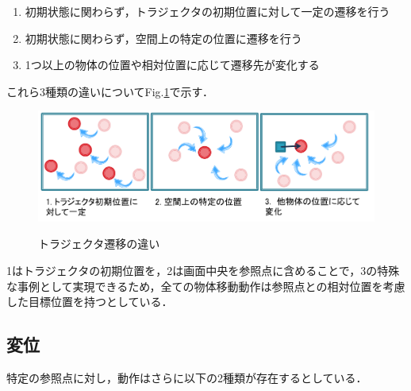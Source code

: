 	\begin{enumerate}
		\item 初期状態に関わらず，トラジェクタの初期位置に対して一定の遷移を行う
		\item 初期状態に関わらず，空間上の特定の位置に遷移を行う
		\item 1つ以上の物体の位置や相対位置に応じて遷移先が変化する
	\end{enumerate}
これら3種類の違いについてFig.\ref{figure:2_moving_trajector}で示す．
	\begin{figure}[h]
		\begin{center}
			\includegraphics[width=14cm]{figure1.png} \\ %
			\caption{トラジェクタ遷移の違い}
			\label{figure:2_moving_trajector}
		\end{center}
	\end{figure}
1はトラジェクタの初期位置を，2は画面中央を参照点に含めることで，3の特殊な事例として実現できるため，全ての物体移動動作は参照点との相対位置を考慮した目標位置を持つとしている．

\subsection{変位}

特定の参照点に対し，動作はさらに以下の2種類が存在するとしている．


